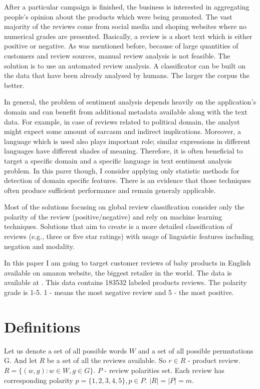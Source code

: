 \documentclass[12pt]{report}
\begin{document}
After a particular campaign is finished, the business is interested in aggregating people's opinion about the products which were being promoted. The vast majority of the reviews come from social media and shoping websites where no numerical grades are presented. Basically, a review is a short text which is either positive or negative. As was mentioned before, because of large quantities of customers and review sources, manual review analysis is not feasible. The solution is to use an automated review analysis. A classificator can be built on the data that have been already analysed by humans. The larger the corpus the better.

In general, the problem of sentiment analysis depends heavily on the application's domain and can benefit from additional metadata available along with the text data. For example, in case of reviews related to political domain, the analyst might expect some amount of sarcasm and indirect implications. Moreover, a language which is used also plays important role; similar expressions in different languages have different shades of meaning. Therefore, it is often beneficial to target a specific domain and a specific language in text sentiment analysis problem. In this parer though, I consider applying only statistic methods for detection of domain specific features. There is an evidence that those techniques often produce sufficient performance \cite{turney} and remain generaly applicable.

Most of the solutions focusing on global review classification consider only the polarity of the review (positive/negative) and rely on machine learning techniques. Solutions that aim to create is a more detailed classification of reviews (e.g., three or five star ratings) with usage of linguistic features including negation and modality.

In this paper I am going to target customer reviews of baby products in English available on amazon website, the biggest retailer in the world. The data is available at \cite{amazon-data}.
This data contains 183532 labeled products reviews. The polarity grade is 1-5. 1 - means the most negative review and 5 - the most positive.

\newpage

\section{Definitions}

Let us denote a set of all possible words $W$ and a set of all possible permutations G.
And let $R$ be a set of all the reviews available. So $r \in R$ - product review.
$R = \{(w, g): w \in W, g \in G\}$.
$P$ - review polarities set. Each review has corresponding polarity $p=\{1,2,3,4,5\}, p \in P$.
$|R| = |P| = m$.
\end{document}
